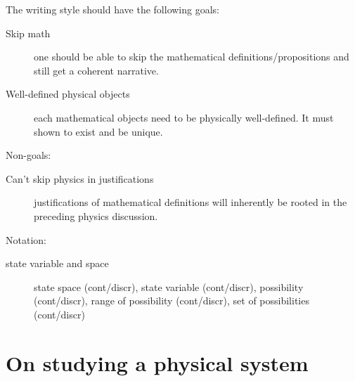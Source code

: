 \documentclass[aps,pra,10pt,twocolumn,floatfix,nofootinbib]{revtex4-1}
\theoremstyle{definition}
\begin{document}
The writing style should have the following goals:
\begin{description}
  \item[Skip math] one should be able to skip the mathematical definitions/propositions and still get a coherent narrative.
  \item[Well-defined physical objects] each mathematical objects need to be physically well-defined. It must shown to exist and be unique.
\end{description}
Non-goals:
\begin{description}
  \item[Can't skip physics in justifications] justifications of mathematical definitions will inherently be rooted in the preceding physics discussion.
\end{description}
Notation:
\begin{description}
  \item[state variable and space] state space (cont/discr), state variable (cont/discr), possibility (cont/discr), range of possibility (cont/discr), set of possibilities (cont/discr)
\end{description}

\section{On studying a physical system}

\end{document}

